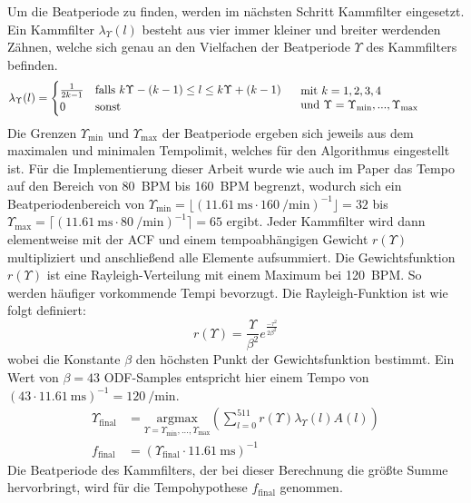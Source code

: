 {{{			%
			Um die Beatperiode zu finden,
				werden im nächsten Schritt Kammfilter eingesetzt.
			Ein Kammfilter $\lambda_\Upsilon(l)$ besteht aus vier immer kleiner und breiter werdenden Zähnen,
				welche sich genau an den Vielfachen der Beatperiode $\Upsilon$ des Kammfilters befinden.
			\begin{equation}
				\lambda_\Upsilon(l) =
				\begin{cases}
					\frac{1}{2k - 1} & \text{falls } k \Upsilon - (k - 1) \leq l \leq k \Upsilon + (k - 1) \\
					0 & \text{sonst}
				\end{cases}
				\hspace{5mm}
				\text{\parbox[c]{5cm}{
					mit $k = 1, 2, 3, 4$ \\
					und $\Upsilon = \Upsilon_\text{min}, ..., \Upsilon_\text{max}$
				}}
			\end{equation}
			Die Grenzen $\Upsilon_\text{min}$ und $\Upsilon_\text{max}$ der Beatperiode ergeben sich jeweils aus dem maximalen und minimalen Tempolimit,
				welches für den Algorithmus eingestellt ist.
			Für die Implementierung dieser Arbeit wurde
				wie auch im Paper
				das Tempo auf den Bereich von \SI{80}{\ac{BPM}} bis \SI{160}{\ac{BPM}} begrenzt,
				wodurch sich ein Beatperiodenbereich
				von $\Upsilon_\text{min} = \lfloor(\SI{11.61}{\milli\second} \cdot \SI{160}{\per\minute})^{-1}\rfloor = 32$
				bis $\Upsilon_\text{max} = \lceil(\SI{11.61}{\milli\second} \cdot \SI{80}{\per\minute})^{-1}\rceil = 65$
				ergibt.
			Jeder Kammfilter wird dann elementweise mit der \ac{ACF} und einem tempoabhängigen Gewicht $r(\Upsilon)$ multipliziert
				und anschlie{\ss}end alle Elemente aufsummiert.
			Die Gewichtsfunktion $r(\Upsilon)$ ist eine Rayleigh-Verteilung mit einem Maximum bei \SI{120}{\ac{BPM}}.
			So werden häufiger vorkommende Tempi bevorzugt.
			Die Rayleigh-Funktion ist wie folgt definiert:
			\begin{equation}
				r(\Upsilon) = \frac{\Upsilon}{\beta^2}e^{\frac{-\tau^2}{2\beta^2}}
			\end{equation}
			wobei die Konstante $\beta$ den höchsten Punkt der Gewichtsfunktion bestimmt.
			Ein Wert von $\beta = 43$ \ac{ODF}-Samples entspricht hier einem Tempo von
				$(43 \cdot \SI{11.61}{\milli\second})^{-1} = \SI{120}{\per\minute}$.
			\begin{align}
				\Upsilon_\text{final} &=
					\underset{\Upsilon = \Upsilon_\text{min}, ..., \Upsilon_\text{max}}{\text{argmax}}
					\left( \sum_{l = 0}^{511} r(\Upsilon) \lambda_\Upsilon(l) A(l) \right) \\
				f_\text{final} &= (\Upsilon_\text{final} \cdot \SI{11.61}{\milli\second})^{-1}
			\end{align}
			Die Beatperiode des Kammfilters,
				der bei dieser Berechnung die grö{\ss}te Summe hervorbringt,
				wird für die Tempohypothese $f_\text{final}$ genommen.

}}}
